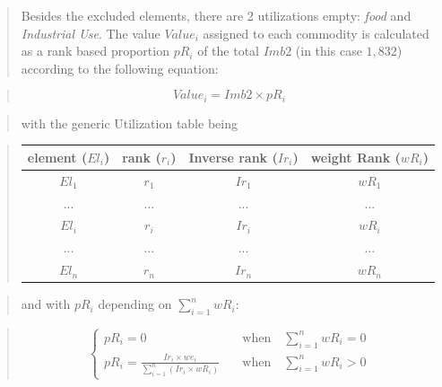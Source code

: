 \documentclass[]{article}
\begin{document}
\begin{quote}
Besides the excluded elements, there are 2 utilizations empty:
\emph{food} and \emph{Industrial Use}. The value \(Value_{i}\) assigned
to each commodity is calculated as a rank based proportion \(pR_{i}\) of
the total \(Imb2\) (in this case \(1,832\)) according to the following
equation:
\end{quote}

\begin{quote}
\begin{equation}
\label{eq:inverseRank}
Value_{i} = Imb2 \times pR_{i}
\end{equation}
\end{quote}

\begin{quote}
with the generic Utilization table being
\end{quote}

\begin{quote}
\begin{center}
\begin{tabular}{ c|c|c|c } 
\hline
element ($El_{i}$) & rank ($r_{i}$) & Inverse rank ($Ir_{i}$) & weight Rank ($wR_{i}$)\\
\hline
$El_{1}$ & $r_{1}$ & $Ir_{1}$  & $wR_{1}$\\ 
... & ... & ... & ...\\ 
$El_{i}$ & $r_{i}$ & $Ir_{i}$  & $wR_{i}$\\ 
... & ... & ... & ...\\ 
$El_{n}$ & $r_{n}$ & $Ir_{n}$  & $wR_{n}$\\ 
\hline
\end{tabular}
\end{center}
\end{quote}

\begin{quote}
and with \(pR_{i}\) depending on \(\sum \limits_{i=1}^n wR_{i}\):
\end{quote}

\begin{quote}
\begin{equation}
\label{eq:weightRank}
\begin{cases}
pR_{i} = 0     & \quad \text{when} \quad \sum \limits_{i=1}^n wR_{i} = 0\\
pR_{i} = \frac{Ir_{i}\times we_{i}}{\sum \limits_{i=1}^n\left(Ir_{i}\times wR_{i}\right)}     & \quad \text{when} \quad \sum \limits_{i=1}^n wR_{i} > 0 
\end{cases}
\end{equation}
\end{quote}
\end{document}
